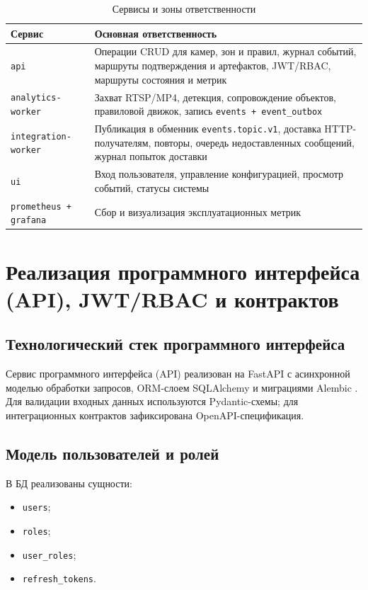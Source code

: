 \begin{table}[H]
\caption{Сервисы и зоны ответственности}
\label{tab:services_responsibility}
\begin{tabularx}{\textwidth}{>{\raggedright\arraybackslash}p{}X}
\toprule
Сервис & Основная ответственность \\
\midrule
\texttt{api} & Операции CRUD для камер, зон и правил, журнал событий, маршруты подтверждения и артефактов, JWT/RBAC, маршруты состояния и метрик \\
\texttt{analytics-worker} & Захват RTSP/MP4, детекция, сопровождение объектов, правиловой движок, запись \texttt{events + event\_outbox} \\
\texttt{integration-worker} & Публикация в обменник \texttt{events.topic.v1}, доставка HTTP-получателям, повторы, очередь недоставленных сообщений, журнал попыток доставки \\
\texttt{ui} & Вход пользователя, управление конфигурацией, просмотр событий, статусы системы \\
\texttt{prometheus + grafana} & Сбор и визуализация эксплуатационных метрик \\
\bottomrule
\end{tabularx}
\end{table}

\section{Реализация программного интерфейса (API), JWT/RBAC и контрактов}

\subsection{Технологический стек программного интерфейса}

Сервис программного интерфейса (API) реализован на FastAPI с асинхронной моделью обработки запросов, ORM-слоем SQLAlchemy и миграциями Alembic \cite{fastapi_docs,sqlalchemy_docs,alembic_docs}. Для валидации входных данных используются Pydantic-схемы; для интеграционных контрактов зафиксирована OpenAPI-спецификация.

\subsection{Модель пользователей и ролей}

В БД реализованы сущности:
\begin{itemize}
    \item \texttt{users};
    \item \texttt{roles};
    \item \texttt{user\_roles};
    \item \texttt{refresh\_tokens}.
\end{itemize}

